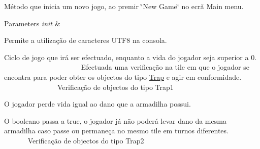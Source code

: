 Método que inicia um novo jogo, ao premir \char`\"{}\+New Game\char`\"{} no ecrã Main menu. 


\begin{DoxyParams}{Parameters}
{\em init} & \\
\hline
\end{DoxyParams}
Permite a utilização de caracteres U\+T\+F8 na consola.

Ciclo de jogo que irá ser efectuado, enquanto a vida do jogador seja superior a 0. ~\newline
~\newline
~\newline
~\newline
~\newline
~\newline
~\newline
~\newline
~\newline
~\newline
~\newline
~\newline
~\newline
 Efectuada uma verificação na tile em que o jogador se encontra para poder obter os objectos do tipo \mbox{\hyperlink{class_projeto2___l_p1_1_1_trap}{Trap}} e agir em conformidade. ~\newline
~\newline
~\newline
~\newline
~\newline
~\newline
~\newline
~\newline
~\newline
~\newline
~\newline
~\newline
 Verificação de objectos do tipo Trap1

O jogador perde vida igual ao dano que a armadilha possui.

O booleano passa a true, o jogador já não poderá levar dano da mesma armadilha caso passe ou permaneça no mesmo tile em turnos diferentes. ~\newline
~\newline
~\newline
~\newline
~\newline
~\newline
~\newline
~\newline
~\newline
 Verificação de objectos do tipo Trap2

